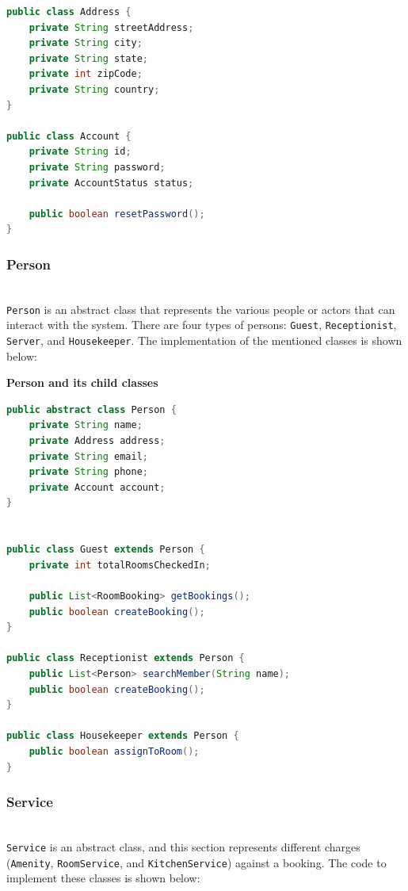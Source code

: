 \begin{lstlisting}[language=Java]
public class Address {
    private String streetAddress;
    private String city;
    private String state;
    private int zipCode;
    private String country;
}

public class Account {
    private String id;
    private String password;
    private AccountStatus status;
  
    public boolean resetPassword();
}
\end{lstlisting}

\subsubsection{Person}\label{tDLcPrXhBdyCmy-YQ43tL}
\\
\texttt{Person} is an abstract class that represents the various people or actors that can interact with the system. There are four types of persons: \texttt{Guest}, \texttt{Receptionist}, \texttt{Server}, and \texttt{Housekeeper}. The implementation of the mentioned classes is shown below:

\textbf{Person and its child classes}

\begin{lstlisting}[language=Java]
public abstract class Person {
    private String name;
    private Address address;
    private String email;
    private String phone;
    private Account account;
}


public class Guest extends Person {
    private int totalRoomsCheckedIn;

    public List<RoomBooking> getBookings();
    public boolean createBooking();
}

public class Receptionist extends Person {
    public List<Person> searchMember(String name);
    public boolean createBooking();
}

public class Housekeeper extends Person {
    public boolean assignToRoom();
}
\end{lstlisting}

\subsubsection{Service}\label{LAMVTngPU8FxxoMdX-5bw}
\\
\texttt{Service} is an abstract class, and this section represents different charges (\texttt{Amenity}, \texttt{RoomService}, and \texttt{KitchenService}) against a booking. The code to implement these classes is shown below:

